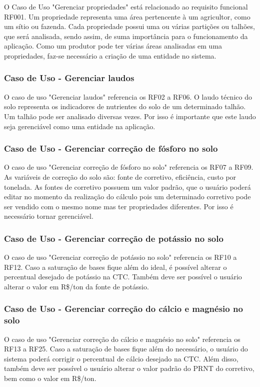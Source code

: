 O Caso de Uso "Gerenciar propriedades" está relacionado ao requisito funcional RF001. Um propriedade representa uma área pertencente à um agricultor, como um sítio ou fazenda. Cada propriedade possui uma ou várias partições ou talhões, que será analisada, sendo assim, de suma importância para o funcionamento da aplicação. Como um produtor pode ter várias áreas analisadas em uma propriedades, faz-se necessário a criação de uma entidade no sistema.

\subsubsection{Caso de Uso - Gerenciar laudos}
\label{sec:titSecCasoUsoLaudos}

O caso de uso "Gerenciar laudos" referencia os RF02 a RF06. O laudo técnico do solo representa os indicadores de nutrientes do solo de um determinado talhão. Um talhão pode ser analisado diversas vezes. Por isso é importante que este laudo seja gerenciável como uma entidade na aplicação.

\subsubsection{Caso de Uso - Gerenciar correção de fósforo no solo}
\label{sec:titSecCasoUsoFosforo}

O caso de uso "Gerenciar correção de fósforo no solo" referencia os RF07 a RF09. As variáveis de correção do solo são: fonte de corretivo, eficiência, custo por tonelada. As fontes de corretivo possuem um valor padrão, que o usuário poderá editar no momento da realização do cálculo pois um determinado corretivo pode ser vendido com o mesmo nome mas ter propriedades diferentes. Por isso é necessário tornar gerenciável.

\subsubsection{Caso de Uso - Gerenciar correção de potássio no solo}
\label{sec:titSecCasoUsoPotassio}

O caso de uso "Gerenciar correção de potássio no solo" referencia os RF10 a RF12. Caso a saturação de bases fique além do ideal, é possível alterar o percentual desejado de potássio na CTC. Também deve ser possível o usuário alterar o valor em R\$/ton da fonte de potássio.

\subsubsection{Caso de Uso - Gerenciar correção do cálcio e magnésio no solo}
\label{sec:titSecCasoUsoCalcioMagnesio}

O caso de uso "Gerenciar correção do cálcio e magnésio no solo" referencia os RF13 a RF25. Caso a saturação de bases fique além do necessário, o usuário do sistema poderá corrigir o percentual de cálcio desejado na CTC. Além disso, também deve ser possível o usuário alterar o valor padrão do PRNT do corretivo, bem como o valor em R\$/ton.